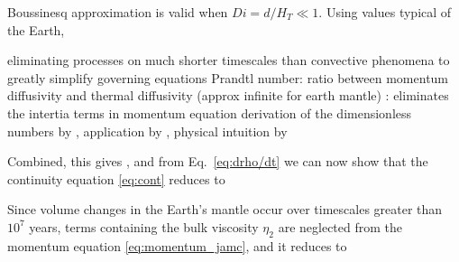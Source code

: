 \documentclass[a4paper]{article}
\begin{document}
Boussinesq approximation is valid when $\mathit{Di} = d/H_T \ll 1$. Using values typical of the Earth, 

eliminating processes on much shorter timescales than convective phenomena to greatly simplify governing equations \autocite{gada20}
Prandtl number: ratio between momentum diffusivity and thermal diffusivity (approx infinite for earth mantle) : eliminates the intertia terms in momentum equation
derivation of the dimensionless numbers by \autocite{scto01}, application by \autocite{jamc80}, physical intuition by \autocite{gada20}

Combined, this gives , and from Eq.~\eqref{eq:drho/dt} we can now show that the continuity equation \eqref{eq:cont} reduces to

Since volume changes in the Earth's mantle occur over timescales greater than $10^7$ years, terms containing the bulk viscosity 
$\eta_2$ are neglected from the momentum equation \eqref{eq:momentum_jamc}, and it reduces to
\end{document}
